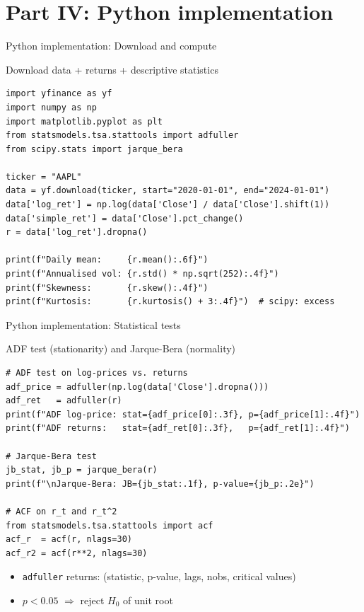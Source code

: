 \documentclass[9pt, aspectratio=169, t]{beamer}
\begin{document}
\section{Part IV: Python implementation}

\begin{frame}[fragile]{Python implementation: Download and compute}
\begin{block}{Download data + returns + descriptive statistics}
\begin{lstlisting}
import yfinance as yf
import numpy as np
import matplotlib.pyplot as plt
from statsmodels.tsa.stattools import adfuller
from scipy.stats import jarque_bera

ticker = "AAPL"
data = yf.download(ticker, start="2020-01-01", end="2024-01-01")
data['log_ret'] = np.log(data['Close'] / data['Close'].shift(1))
data['simple_ret'] = data['Close'].pct_change()
r = data['log_ret'].dropna()

print(f"Daily mean:     {r.mean():.6f}")
print(f"Annualised vol: {r.std() * np.sqrt(252):.4f}")
print(f"Skewness:       {r.skew():.4f}")
print(f"Kurtosis:       {r.kurtosis() + 3:.4f}")  # scipy: excess
\end{lstlisting}
\end{block}
\end{frame}

\begin{frame}[fragile]{Python implementation: Statistical tests}
\begin{block}{ADF test (stationarity) and Jarque-Bera (normality)}
\begin{lstlisting}
# ADF test on log-prices vs. returns
adf_price = adfuller(np.log(data['Close'].dropna()))
adf_ret   = adfuller(r)
print(f"ADF log-price: stat={adf_price[0]:.3f}, p={adf_price[1]:.4f}")
print(f"ADF returns:   stat={adf_ret[0]:.3f},   p={adf_ret[1]:.4f}")

# Jarque-Bera test
jb_stat, jb_p = jarque_bera(r)
print(f"\nJarque-Bera: JB={jb_stat:.1f}, p-value={jb_p:.2e}")

# ACF on r_t and r_t^2
from statsmodels.tsa.stattools import acf
acf_r  = acf(r, nlags=30)
acf_r2 = acf(r**2, nlags=30)
\end{lstlisting}
\end{block}
\begin{itemize}\setlength{\itemsep}{0pt}
    \item {\small \texttt{adfuller} returns: (statistic, p-value, lags, nobs, critical values)}
    \item {\small $p < 0.05$ $\Rightarrow$ reject $H_0$ of unit root}
\end{itemize}
\end{frame}
\end{document}
